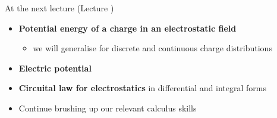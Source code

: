 
%
%

\renewcommand{\lecturesummarytitle}{Main points to remember }


%
%

\begin{frame}{At the next lecture (Lecture \nextlecture)}

\begin{itemize}
  \item {\bf Potential energy of a charge in an electrostatic field}
    \begin{itemize}
       \item we will generalise for discrete and continuous charge distributions
    \end{itemize}

  \vspace{0.4cm}
  \item {\bf Electric potential}

  \vspace{0.4cm}
  \item {\bf Circuital law for electrostatics} in differential and integral forms

  \vspace{0.4cm}
  \item Continue brushing up our relevant calculus skills

\end{itemize}

\end{frame}

%
%


